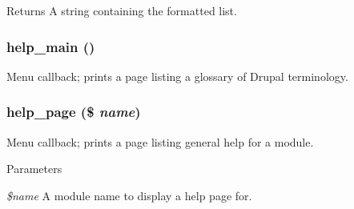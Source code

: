 \begin{DoxyReturn}{Returns}
A string containing the formatted list. 
\end{DoxyReturn}
\hypertarget{help_8admin_8inc_a88c3f4bd225be1ceb6e8e4cdbb788999}{
\subsubsection[{help\_\-main}]{\setlength{\rightskip}{0pt plus 5cm}help\_\-main ()}}
\label{help_8admin_8inc_a88c3f4bd225be1ceb6e8e4cdbb788999}
Menu callback; prints a page listing a glossary of Drupal terminology. \hypertarget{help_8admin_8inc_af233fe63b8d02f02d9a68c9ef5b09b7e}{
\subsubsection[{help\_\-page}]{\setlength{\rightskip}{0pt plus 5cm}help\_\-page (\$ {\em name})}}
\label{help_8admin_8inc_af233fe63b8d02f02d9a68c9ef5b09b7e}
Menu callback; prints a page listing general help for a module.


\begin{DoxyParams}{Parameters}
\item[{\em \$name}]A module name to display a help page for. \end{DoxyParams}
